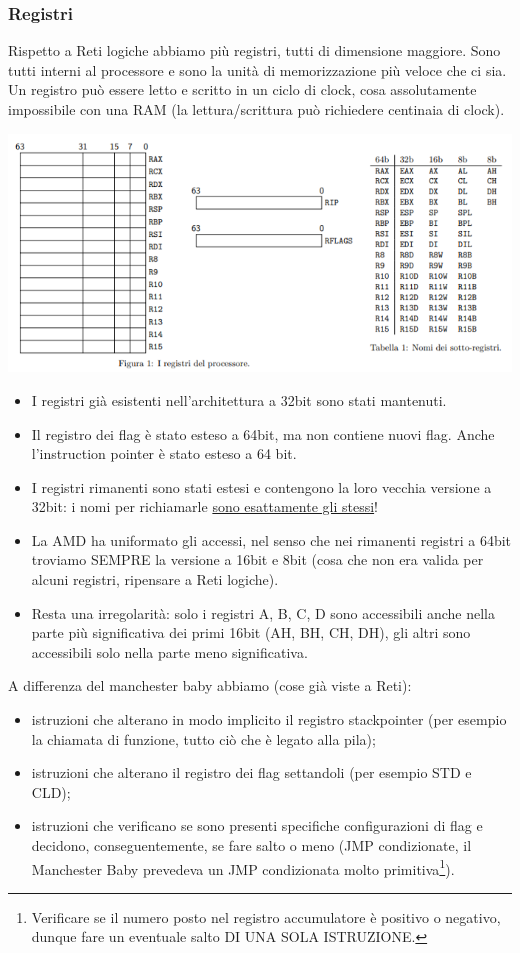 \subsubsection{Registri} Rispetto a Reti logiche abbiamo più registri, tutti di dimensione maggiore. Sono tutti interni al processore e sono la unità di memorizzazione più veloce che ci sia. Un registro può essere letto e scritto in un ciclo di clock, cosa assolutamente impossibile con una RAM (la lettura/scrittura può richiedere centinaia di clock). 
\begin{center}
	\includegraphics{img/5.PNG}
\end{center}
\begin{itemize}
	\item I registri già esistenti nell'architettura a 32bit sono stati mantenuti.
	\item Il registro dei flag è stato esteso a 64bit, ma non contiene nuovi flag. Anche l'instruction pointer è stato esteso a 64 bit.
	\item I registri rimanenti sono stati estesi e contengono la loro vecchia versione a 32bit: i nomi per richiamarle \underline{sono esattamente gli stessi}!
	\item La AMD ha uniformato gli accessi, nel senso che nei rimanenti registri a 64bit troviamo SEMPRE la versione a 16bit e 8bit (cosa che non era valida per alcuni registri, ripensare a Reti logiche). 
	\item Resta una irregolarità: solo i registri A, B, C, D sono accessibili anche nella parte più significativa dei primi 16bit (AH, BH, CH, DH), gli altri sono accessibili solo nella parte meno significativa.
\end{itemize}
A differenza del manchester baby abbiamo (cose già viste a Reti):
\begin{itemize}
	\item istruzioni che alterano in modo implicito il registro stackpointer (per esempio la chiamata di funzione, tutto ciò che è legato alla pila);
	\item istruzioni che alterano il registro dei flag settandoli (per esempio STD e CLD);
	\item istruzioni che verificano se sono presenti specifiche configurazioni di flag e decidono, conseguentemente, se fare salto o meno (JMP condizionate, il Manchester Baby prevedeva un JMP condizionata molto primitiva\footnote{Verificare se il numero posto nel registro accumulatore è positivo o negativo, dunque fare un eventuale salto DI UNA SOLA ISTRUZIONE.}).
\end{itemize}